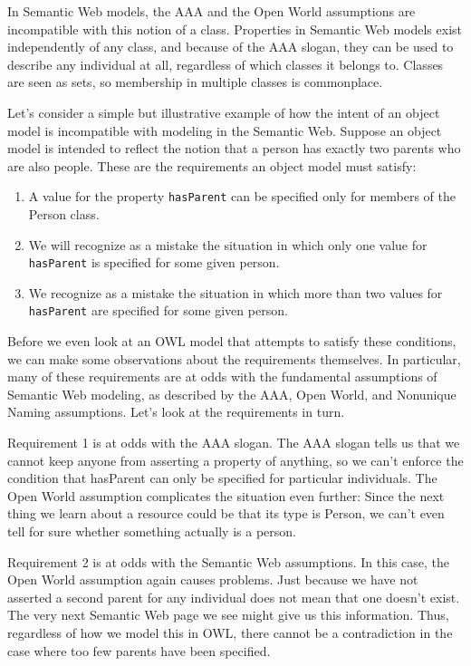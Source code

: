 In Semantic Web models, the AAA and the Open World assumptions are
incompatible with this notion of a class. Properties in Semantic Web
models exist independently of any class, and because of the AAA slogan,
they can be used to describe any individual at all, regardless of which
classes it belongs to. Classes are seen as sets, so membership in
multiple classes is commonplace.

Let's consider a simple but illustrative example of how the intent of an
object model is incompatible with modeling in the Semantic Web. Suppose
an object model is intended to reflect the notion that a person has
exactly two parents who are also people. These are the requirements an
object model must satisfy:

\begin{enumerate}
\item A value for the property \texttt{hasParent} can be specified only for members
of the Person class.

\item  We will recognize as a mistake the situation in which only one value
for \texttt{hasParent} is specified for some given person.

\item  We recognize as a mistake the situation in which more than two values
for \texttt{hasParent} are specified for some given person.
\end{enumerate}


Before we even look at an OWL model that attempts to satisfy these
conditions, we can make some observations about the requirements
themselves. In particular, many of these requirements are at odds with
the fundamental assumptions of Semantic Web modeling, as described by
the AAA, Open World, and Nonunique Naming assumptions. Let's look at the
requirements in turn.

Requirement 1 is at odds with the AAA slogan. The AAA slogan tells us
that we cannot keep anyone from asserting a property of anything, so we
can't enforce the condition that hasParent can only be specified for
particular individuals. The Open World assumption complicates the
situation even further: Since the next thing we learn about a resource
could be that its type is Person, we can't even tell for sure whether
something actually is a person.

Requirement 2 is at odds with the Semantic Web assumptions. In this
case, the Open World assumption again causes problems. Just because we
have not asserted a second parent for any individual does not mean that
one doesn't exist. The very next Semantic Web page we see might give us
this information. Thus, regardless of how we model this in OWL, there
cannot be a contradiction in the case where too few parents have been
specified.

